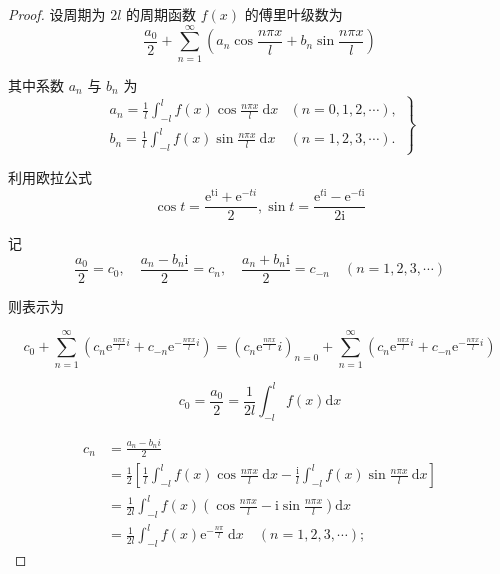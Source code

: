 \begin{proof}
    设周期为 $ 2 l $ 的周期函数 $ f(x) $ 的傅里叶级数为
\begin{equation}
\frac{a_{0}}{2}+\sum_{n=1}^{\infty}\left(a_{n} \cos \frac{n \pi x}{l}+b_{n} \sin \frac{n \pi x}{l}\right)
\end{equation}

其中系数 $ a_{n} $ 与 $ b_{n} $ 为
\begin{equation}
\left.\begin{array}{ll}
a_{n}=\frac{1}{l} \int_{-l}^{l} f(x) \cos \frac{n \pi x}{l} \mathrm{~d} x & (n=0,1,2, \cdots), \\
b_{n}=\frac{1}{l} \int_{-l}^{l} f(x) \sin \frac{n \pi x}{l} \mathrm{~d} x & (n=1,2,3, \cdots) .
\end{array}\right\}
\end{equation}

利用欧拉公式
\begin{equation} \cos t=\frac{\mathrm{e}^{\mathrm{ti}}+\mathrm{e}^{-t i}}{2}, \sin t=\frac{\mathrm{e}^{t \mathrm{i}}-\mathrm{e}^{-t \mathrm{i}}}{2 \mathrm{i}} \end{equation}

记
\begin{equation}
\frac{a_{0}}{2}=c_{0}, \quad \frac{a_{n}-b_{n} \mathrm{i}}{2}=c_{n}, \quad \frac{a_{n}+b_{n} \mathrm{i}}{2}=c_{-n} \quad(n=1,2,3, \cdots)
\end{equation}

则表示为

\begin{equation} c_{0}+\sum_{n=1}^{\infty}\left(c_{n} \mathrm{e}^{\frac{n \pi x}{l} i}+c_{-n} \mathrm{e}^{-\frac{n \pi x}{l} i}\right) =\left(c_{n} \mathrm{e}^{\frac{n \pi x}{l}}i\right)_{n=0}+\sum_{n=1}^{\infty}\left(c_{n} \mathrm{e}^{\frac{n \pi x}{l}i}+c_{-n} \mathrm{e}^{-\frac{n \pi x}{l}i}\right) \end{equation}

\begin{equation} c_{0}=\frac{a_{0}}{2}=\frac{1}{2 l} \int_{-l}^{l} f(x) \mathrm{d} x \end{equation}

\begin{equation}
\begin{aligned}
   c_{n} &=\frac{a_{n}-b_{n} i}{2}  \\
   &=\frac{1}{2}\left[\frac{1}{l} \int_{-l}^{l} f(x) \cos \frac{n \pi x}{l} \mathrm{~d} x-\frac{\mathrm{i}}{l} \int_{-l}^{l} f(x) \sin \frac{n \pi x}{l} \mathrm{~d} x\right] \\
   &=\frac{1}{2 l} \int_{-l}^{l} f(x)\left(\cos \frac{n \pi x}{l}-\mathrm{i} \sin \frac{n \pi x}{l}\right) \mathrm{d} x\\
   &=\frac{1}{2 l} \int_{-l}^{l} f(x) \mathrm{e}^{-\frac{n \pi}{l}} \mathrm{~d} x \quad(n=1,2,3, \cdots) ;
\end{aligned}
\end{equation}


\end{proof}
